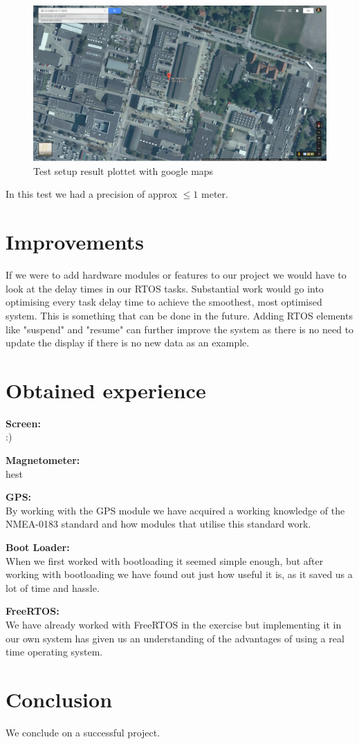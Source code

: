 \begin{figure}[H]
\centering
\includegraphics[width=.9\textwidth]{billeder/coordinate_map}
\caption{Test setup result plottet with google maps}
\end{figure}

In this test we had a precision of approx $\leq1$ meter.

\chapter{Improvements}
If we were to add hardware modules or features to our project we would have to look at the delay times in our RTOS tasks. Substantial work would go into optimising every task delay time to achieve the smoothest, most optimised system. This is something that can be done in the future. Adding RTOS elements like "suspend" and "resume" can further improve the system as there is no need to update the display if there is no new data as an example. \\

\chapter{Obtained experience}
\textbf{Screen:}\\
:)

\textbf{Magnetometer:}\\
hest

\textbf{GPS:}\\
By working with the GPS module we have acquired a working knowledge of the NMEA-0183 standard and how modules that utilise this standard work. 

\textbf{Boot Loader:}\\
When we first worked with bootloading it seemed simple enough, but after working with bootloading we have found out just how useful it is, as it saved us a lot of time and hassle.

\textbf{FreeRTOS:}\\
We have already worked with FreeRTOS in the exercise but implementing it in our own system has given us an understanding of the advantages of using a real time operating system. 





\chapter{Conclusion}
We conclude on a successful project.


